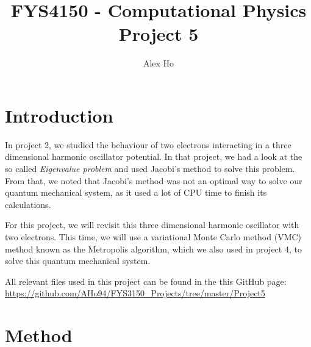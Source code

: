 \documentclass[12pt]{article}
\author{Alex Ho}
\title{FYS4150 - Computational Physics \\ Project 5}
\begin{document}
\maketitle
\begin{abstract}
\end{abstract}
\newpage
\tableofcontents
\newpage
\section{Introduction} \label{section:intro}
In project 2, we studied the behaviour of two electrons interacting in a three dimensional harmonic oscillator potential. In that project, we had a look at the so called \emph{Eigenvalue problem} and used Jacobi's method to solve this problem. From that, we noted that Jacobi's method was not an optimal way to solve our quantum mechanical system, as it used a lot of CPU time to finish its calculations.

For this project, we will revisit this three dimensional harmonic oscillator with two electrons. This time, we will use a variational Monte Carlo method (VMC) method known as the Metropolis algorithm, which we also used in project 4, to solve this quantum mechanical system.

All relevant files used in this project can be found in the this GitHub page:
\url{https://github.com/AHo94/FYS3150_Projects/tree/master/Project5}
\section{Method} \label{section:method}
\end{document}
